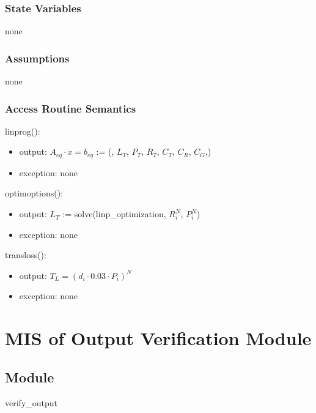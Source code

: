 \documentclass[12pt, titlepage]{article}
\begin{document}
\subsubsection{State Variables}

none

\subsubsection{Assumptions}

none

\subsubsection{Access Routine Semantics}

linprog(): 
\renewcommand*{\arraystretch}{1.5}
\begin{itemize}
\item output:
$A_{eq} \cdot x = b_{eq}$ := (, $L_T$,
$P_T$, $R_T$, $C_T$, $C_R$, $C_G$,)\\
\item exception: none

\end{itemize}

optimoptions(): 
\renewcommand*{\arraystretch}{1.5}
\begin{itemize}
\item output: $L_T$ := solve(linp\_optimization,
$R_i^N$, $P_i^N$)\\
\item exception: none
\end{itemize}
transloss(): 
\renewcommand*{\arraystretch}{1.5}
\begin{itemize}
\item output:
$T_L = (d_i \cdot 0.03 \cdot P_i)^{N}$\\
\item exception: none
\end{itemize}
\newpage


\section{MIS of Output Verification Module} \label{VerifyOutput}

\subsection{Module}

verify\_output
\end{document}

